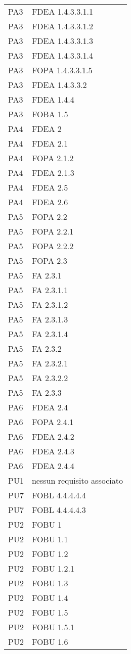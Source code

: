\begin{longtable}{XX}
PA3&FDEA 1.4.3.3.1.1\\ 
PA3&FDEA 1.4.3.3.1.2\\ 
PA3&FDEA 1.4.3.3.1.3\\ 
PA3&FDEA 1.4.3.3.1.4\\ 
PA3&FOPA 1.4.3.3.1.5\\ 
PA3&FDEA 1.4.3.3.2\\ 
PA3&FDEA 1.4.4\\ 
PA3&FOBA 1.5\\ 
\midrule 
PA4&FDEA 2\\ 
PA4&FDEA 2.1\\ 
PA4&FOPA 2.1.2\\ 
PA4&FDEA 2.1.3\\ 
PA4&FDEA 2.5\\ 
PA4&FDEA 2.6\\ 
\midrule 
PA5&FOPA 2.2\\ 
PA5&FOPA 2.2.1\\ 
PA5&FOPA 2.2.2\\ 
PA5&FOPA 2.3\\ 
PA5&FA 2.3.1\\ 
PA5&FA 2.3.1.1\\ 
PA5&FA 2.3.1.2\\ 
PA5&FA 2.3.1.3\\ 
PA5&FA 2.3.1.4\\ 
PA5&FA 2.3.2\\ 
PA5&FA 2.3.2.1\\ 
PA5&FA 2.3.2.2\\ 
PA5&FA 2.3.3\\ 
\midrule 
PA6&FDEA 2.4\\ 
PA6&FOPA 2.4.1\\ 
PA6&FDEA 2.4.2\\ 
PA6&FDEA 2.4.3\\ 
PA6&FDEA 2.4.4\\ 
\midrule 
PU1&nessun requisito associato\\ 
\midrule 
PU7&FOBL 4.4.4.4.4\\ 
\midrule 
PU7&FOBL 4.4.4.4.3\\ 
\midrule 
PU2&FOBU 1\\ 
PU2&FOBU 1.1\\ 
PU2&FOBU 1.2\\ 
PU2&FOBU 1.2.1\\ 
PU2&FOBU 1.3\\ 
PU2&FOBU 1.4\\ 
PU2&FOBU 1.5\\ 
PU2&FOBU 1.5.1\\ 
PU2&FOBU 1.6\\ 

\end{longtable}
